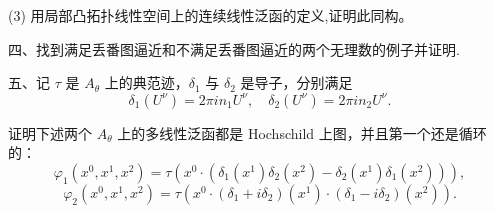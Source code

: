  (3) 用局部凸拓扑线性空间上的连续线性泛函的定义,证明此同构。


 四、找到满足丢番图逼近和不满足丢番图逼近的两个无理数的例子并证明.

 五、记 \(\tau\) 是 \(A_\theta\) 上的典范迹，\(\delta_1\) 与 \(\delta_2\) 是导子，分别满足
\[
\delta_1(U^\nu) = 2\pi i n_1 U^\nu, \quad \delta_2(U^\nu) = 2\pi i n_2 U^\nu.
\]

证明下述两个 \(A_\theta\) 上的多线性泛函都是 Hochschild 上图，并且第一个还是循环的：
\[
\varphi_1(x^0, x^1, x^2) = \tau \left( x^0 \cdot (\delta_1(x^1)\delta_2(x^2) - \delta_2(x^1)\delta_1(x^2)) \right),
\]
\[
\varphi_2(x^0, x^1, x^2) = \tau \left( x^0 \cdot (\delta_1 + i\delta_2)(x^1) \cdot (\delta_1 - i\delta_2)(x^2) \right).
\]
